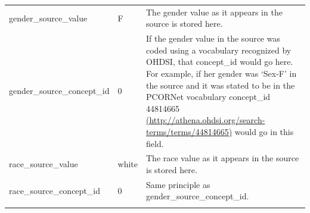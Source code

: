 \documentclass[]{book}
\begin{document}
\begin{longtable}[]{@{}lll@{}}
\begin{minipage}[t]{0.33\columnwidth}\raggedright
gender\_source\_value\strut
\end{minipage} & \begin{minipage}[t]{0.15\columnwidth}\raggedright
F\strut
\end{minipage} & \begin{minipage}[t]{0.43\columnwidth}\raggedright
The gender value as it appears in the source is stored here.\strut
\end{minipage}\tabularnewline
\begin{minipage}[t]{0.33\columnwidth}\raggedright
gender\_source\_concept\_id\strut
\end{minipage} & \begin{minipage}[t]{0.15\columnwidth}\raggedright
0\strut
\end{minipage} & \begin{minipage}[t]{0.43\columnwidth}\raggedright
If the gender value in the source was coded using a vocabulary recognized by OHDSI, that concept\_id would go here. For example, if her gender was `Sex-F' in the source and it was stated to be in the PCORNet vocabulary concept\_id 44814665 \href{http://athena.ohdsi.org/search-terms/terms/44814665}{(http://athena.ohdsi.org/search-terms/terms/44814665)} would go in this field.\strut
\end{minipage}\tabularnewline
\begin{minipage}[t]{0.33\columnwidth}\raggedright
race\_source\_value\strut
\end{minipage} & \begin{minipage}[t]{0.15\columnwidth}\raggedright
white\strut
\end{minipage} & \begin{minipage}[t]{0.43\columnwidth}\raggedright
The race value as it appears in the source is stored here.\strut
\end{minipage}\tabularnewline
\begin{minipage}[t]{0.33\columnwidth}\raggedright
race\_source\_concept\_id\strut
\end{minipage} & \begin{minipage}[t]{0.15\columnwidth}\raggedright
0\strut
\end{minipage} & \begin{minipage}[t]{0.43\columnwidth}\raggedright
Same principle as gender\_source\_concept\_id.\strut
\end{minipage}\tabularnewline
\begin{minipage}[t]{0.33\columnwidth}\raggedright

\end{minipage}
\end{longtable}
\end{document}
